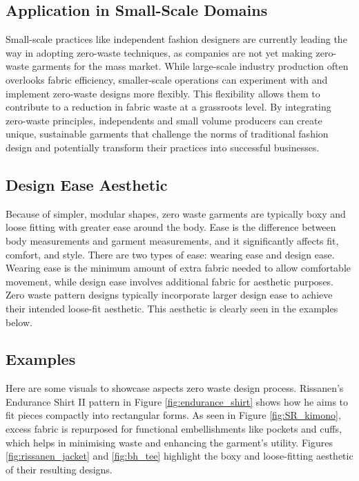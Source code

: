 \subsection{Application in Small-Scale Domains}
Small-scale practices like independent fashion designers are currently leading the way in adopting zero-waste techniques, as companies are not yet making zero-waste garments for the mass market. While large-scale industry production often overlooks fabric efficiency, smaller-scale operations can experiment with and implement zero-waste designs more flexibly. This flexibility allows them to contribute to a reduction in fabric waste at a grassroots level. By integrating zero-waste principles, independents and small volume producers can create unique, sustainable garments that challenge the norms of traditional fashion design and potentially transform their practices into successful businesses.

\subsection{Design Ease Aesthetic}
Because of simpler, modular shapes, zero waste garments are typically boxy and loose fitting with greater ease around the body. Ease is the difference between body measurements and garment measurements, and it significantly affects fit, comfort, and style. There are two types of ease: wearing ease and design ease. Wearing ease is the minimum amount of extra fabric needed to allow comfortable movement, while design ease involves additional fabric for aesthetic purposes. Zero waste pattern designs typically incorporate larger design ease to achieve their intended loose-fit aesthetic. This aesthetic is clearly seen in the examples below.

\subsection{Examples}
Here are some visuals to showcase aspects zero waste design process. Rissanen's Endurance Shirt II pattern in Figure \ref{fig:endurance_shirt} shows how he aims to fit pieces compactly into rectangular forms. As seen in Figure \ref{fig:SR_kimono}, excess fabric is repurposed for functional embellishments like pockets and cuffs, which helps in minimising waste and enhancing the garment's utility. Figures \ref{fig:rissanen_jacket} and \ref{fig:bh_tee} highlight the boxy and loose-fitting aesthetic of their resulting designs.

